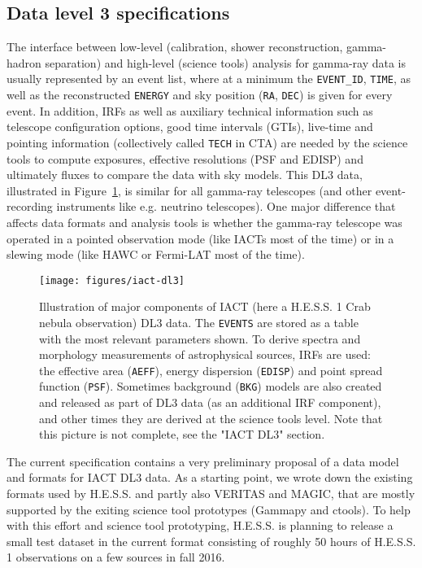\subsection{Data level 3 specifications}

The interface between low-level (calibration, shower reconstruction, gamma-hadron separation) and high-level (science tools) analysis for gamma-ray data is usually represented by an event list, where at a minimum the \texttt{EVENT\_ID}, \texttt{TIME}, as well as the reconstructed \texttt{ENERGY} and sky position (\texttt{RA}, \texttt{DEC}) is given for every event. In addition, IRFs as well as auxiliary technical information such as telescope configuration options, good time intervals (GTIs), live-time and pointing information (collectively called \texttt{TECH} in CTA) are needed by the science tools to compute exposures, effective resolutions (PSF and EDISP) and ultimately fluxes to compare the data with sky models. This DL3 data, illustrated in Figure~\ref{fig:iact-dl3}, is similar for all gamma-ray telescopes (and other event-recording instruments like e.g. neutrino telescopes). One major difference that affects data formats and analysis tools is whether the gamma-ray telescope was operated in a pointed observation mode (like IACTs most of the time) or in a slewing mode (like HAWC or Fermi-LAT most of the time).

\begin{figure}[tb]
\centerline{\texttt{[image: figures/iact-dl3]}}
\caption{
Illustration of major components of IACT (here a H.E.S.S. 1 Crab nebula observation) DL3 data. The \texttt{EVENTS} are stored as a table with the most relevant parameters shown. To derive spectra and morphology measurements of astrophysical sources, IRFs are used: the effective area (\texttt{AEFF}), energy dispersion (\texttt{EDISP}) and point spread function (\texttt{PSF}). Sometimes background (\texttt{BKG}) models are also created and released as part of DL3 data (as an additional IRF component), and other times they are derived at the science tools level. Note that this picture is not complete, see the "IACT DL3" section.
}
\label{fig:iact-dl3}
\end{figure}

The current specification contains a very preliminary proposal of a data model and formats for IACT DL3 data. As a starting point, we wrote down the existing formats used by H.E.S.S. and partly also VERITAS and MAGIC, that are mostly supported by the exiting science tool prototypes (Gammapy and ctools). To help with this \gadf effort and science tool prototyping, H.E.S.S. is planning to release a small test dataset in the current format consisting of roughly 50 hours of H.E.S.S. 1 observations on a few sources in fall 2016.

